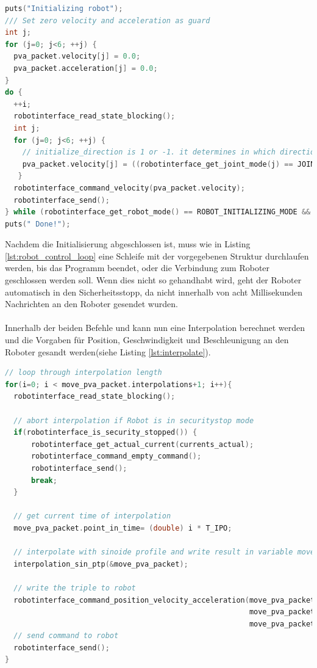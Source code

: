 \begin{lstlisting}[language=C,caption={Initialisierung der einzelnen Gelenke}, label=lst:initialize_robot_lst,captionpos=b]
puts("Initializing robot");
/// Set zero velocity and acceleration as guard
int j;
for (j=0; j<6; ++j) {
  pva_packet.velocity[j] = 0.0;
  pva_packet.acceleration[j] = 0.0;
}
do {
  ++i;
  robotinterface_read_state_blocking();
  int j;
  for (j=0; j<6; ++j) {
    // initialize_direction is 1 or -1. it determines in which direction die Joint is moving during the initialization
    pva_packet.velocity[j] = ((robotinterface_get_joint_mode(j) == JOINT_INITIALISATION_MODE)) ? (initialize_direction)* 0.1 : 0.0;
   }
  robotinterface_command_velocity(pva_packet.velocity);
  robotinterface_send();
} while (robotinterface_get_robot_mode() == ROBOT_INITIALIZING_MODE && exit_flag == false);
puts(" Done!");
\end{lstlisting}

Nachdem die Initialisierung abgeschlossen ist, muss wie in Listing \ref{lst:robot_control_loop} eine Schleife mit der vorgegebenen Struktur durchlaufen werden, bis das Programm beendet, oder die Verbindung zum Roboter geschlossen werden soll. Wenn dies nicht so gehandhabt wird, geht der Roboter automatisch in den Sicherheitsstopp, da nicht innerhalb von acht Millisekunden Nachrichten an den Roboter gesendet wurden.
\\\\
Innerhalb der beiden Befehle  und  kann nun eine Interpolation berechnet werden und die Vorgaben für Position, Geschwindigkeit und Beschleunigung an den Roboter gesandt werden(siehe Listing \ref{lst:interpolate}).

\begin{lstlisting}[language=C,caption={Interpolation eines berechneten Wegs}, label=lst:interpolate,captionpos=b]
// loop through interpolation length  
for(i=0; i < move_pva_packet.interpolations+1; i++){
  robotinterface_read_state_blocking();

  // abort interpolation if Robot is in securitystop mode
  if(robotinterface_is_security_stopped()) {
      robotinterface_get_actual_current(currents_actual);
      robotinterface_command_empty_command();
      robotinterface_send();
      break;
  }

  // get current time of interpolation 
  move_pva_packet.point_in_time= (double) i * T_IPO;

  // interpolate with sinoide profile and write result in variable move_pva_packet
  interpolation_sin_ptp(&move_pva_packet);

  // write the triple to robot
  robotinterface_command_position_velocity_acceleration(move_pva_packet.pva.position,
                                                        move_pva_packet.pva.velocity,
                                                        move_pva_packet.pva.acceleration);
  // send command to robot
  robotinterface_send();
}
\end{lstlisting}

